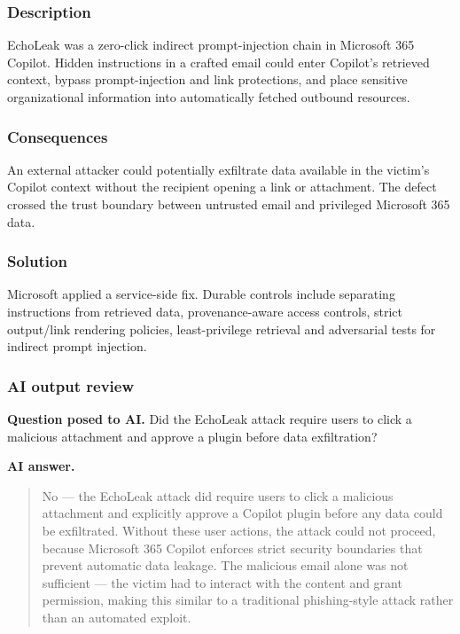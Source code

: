 \subsubsection{Description}

EchoLeak was a zero-click indirect prompt-injection chain in Microsoft 365 Copilot. Hidden instructions in a crafted email could enter Copilot's retrieved context, bypass prompt-injection and link protections, and place sensitive organizational information into automatically fetched outbound resources.

\subsubsection{Consequences}

An external attacker could potentially exfiltrate data available in the victim's Copilot context without the recipient opening a link or attachment. The defect crossed the trust boundary between untrusted email and privileged Microsoft 365 data.

\subsubsection{Solution}

Microsoft applied a service-side fix. Durable controls include separating instructions from retrieved data, provenance-aware access controls, strict output/link rendering policies, least-privilege retrieval and adversarial tests for indirect prompt injection.

\subsubsection{AI output review}

\textbf{Question posed to AI.} Did the EchoLeak attack require users to click a malicious attachment and approve a plugin before data exfiltration?

\textbf{AI answer.} \begin{quote}\small No — the EchoLeak attack did require users to click a malicious attachment and explicitly approve a Copilot plugin before any data could be exfiltrated. Without these user actions, the attack could not proceed, because Microsoft 365 Copilot enforces strict security boundaries that prevent automatic data leakage. The malicious email alone was not sufficient — the victim had to interact with the content and grant permission, making this similar to a traditional phishing-style attack rather than an automated exploit.\end{quote}

